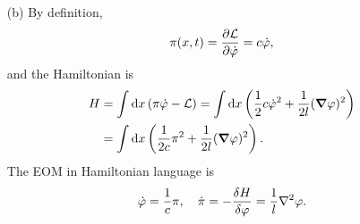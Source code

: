 \documentclass[hyperref, a4paper]{article}
\begin{document}
\begin{itemize}
\item[(b)] By definition, 
\begin{equation}
    \pi(x, t) = \pdv{\mathcal{L}}{\dot{\varphi}} = c \dot{\varphi},
\end{equation}
and the Hamiltonian is 
\begin{equation}
    \begin{aligned}
        H &= \int \dd{x} (\pi \dot{\varphi} - \mathcal{L}) 
        = \int \dd{x} \left( \frac{1}{2} c \dot{\varphi}^2 + \frac{1}{2l} (\grad{\varphi})^2 \right) \\
        &= \int \dd{x} \left( \frac{1}{2c} \pi^2 + \frac{1}{2l} (\grad{\varphi})^2 \right) .
    \end{aligned}
\end{equation}
The EOM in Hamiltonian language is 
\begin{equation}
    \dot{\varphi} = \frac{1}{c} \pi, \quad 
    \dot{\pi} = - \fdv{H}{\varphi} = \frac{1}{l} \laplacian \varphi.
\end{equation}


\end{itemize}
\end{document}

